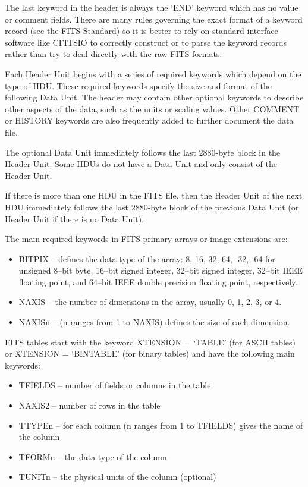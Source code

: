 \documentclass[11pt]{book}
\begin{document}
The last keyword in the header is always the `END' keyword which has no
value or comment fields. There are many rules governing the exact
format of a keyword record (see the FITS Standard) so it is better
to rely on standard interface software like CFITSIO to correctly
construct or to parse the keyword records rather than try to deal
directly with the raw FITS formats.

Each Header Unit begins with a series of required keywords which depend
on the type of HDU.  These required keywords specify the size and
format of the following Data Unit.  The header may contain other
optional keywords to describe other aspects of the data, such as the
units or scaling values.  Other COMMENT or HISTORY keywords are also
frequently added to further document the data file.

The optional Data Unit immediately follows the last 2880-byte block in
the Header Unit.  Some HDUs do not have a Data Unit and only consist of
the Header Unit.

If there is more than one HDU in the FITS file, then the Header Unit of
the next HDU immediately follows the last 2880-byte block of the
previous Data Unit (or Header Unit if there is no Data Unit).

The main required keywords in FITS primary arrays or image extensions are:
\begin{itemize}
\item
BITPIX -- defines the data type of the array: 8, 16, 32, 64, -32, -64 for
unsigned 8--bit byte, 16--bit signed integer, 32--bit signed integer,
32--bit IEEE floating point, and 64--bit IEEE double precision floating
point, respectively.
\item
NAXIS --  the number of dimensions in the array, usually 0, 1, 2, 3, or 4.
\item
NAXISn -- (n ranges from 1 to NAXIS) defines the size of each dimension.
\end{itemize}

FITS tables start with the keyword XTENSION = `TABLE' (for ASCII
tables) or XTENSION = `BINTABLE' (for binary tables) and have the
following main keywords:
\begin{itemize}
\item
TFIELDS -- number of fields or columns in the table
\item
NAXIS2 -- number of rows in the table
\item
TTYPEn -- for each column (n ranges from 1 to TFIELDS) gives the
name of the column
\item
TFORMn -- the data type of the column
\item
TUNITn -- the physical units of the column (optional)
\end{itemize}
\end{document}
